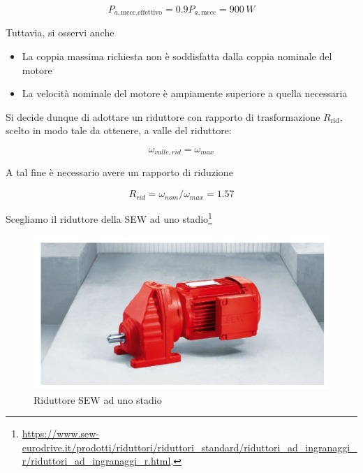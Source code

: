 \documentclass[a4paper,12pt]{article}
\begin{document}
\[
    P_{a, \text{mecc,effettivo}} = 0.9 P_{a, \text{mecc}}=900\,W
\]

\vspace{0.5cm}

Tuttavia, si osservi anche

\begin{itemize}
    \item La coppia massima richiesta non è soddisfatta dalla coppia nominale del motore
    \item La velocità nominale del motore è ampiamente superiore a quella necessaria
\end{itemize}

\vspace{0.5cm}

Si decide dunque di adottare un riduttore con rapporto di trasformazione \( R_{\text{rid}} \), scelto in modo tale da ottenere, a valle del riduttore:

\[
    \omega_{valle,rid} = \omega_{max}
\]

\vspace{0.5cm}
A tal fine è necessario avere un rapporto di riduzione 

\[
    R_{rid} = \omega_{nom} / \omega_{max}  = 1.57
\]

\vspace{0.5cm}

Scegliamo il riduttore della SEW ad uno stadio\footnote{\url{https://www.sew-eurodrive.it/prodotti/riduttori/riduttori_standard/riduttori_ad_ingranaggi_r/riduttori_ad_ingranaggi_r.html}.}

\begin{figure}[h!]
    \centering
    \includegraphics[scale=0.6]{Immagini/Altre/riduttore.PNG}
    \caption{Riduttore SEW ad uno stadio}
    \label{fig: riduttore SEW}
\end{figure}

\vspace{0.5cm}
\end{document}
